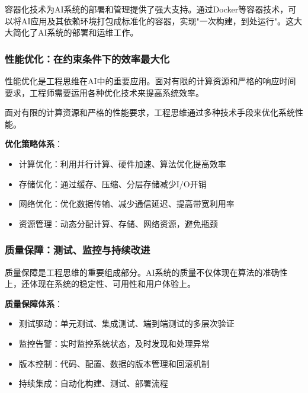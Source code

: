 容器化技术为AI系统的部署和管理提供了强大支持。通过Docker等容器技术，可以将AI应用及其依赖环境打包成标准化的容器，实现"一次构建，到处运行"。这大大简化了AI系统的部署和运维工作。

\subsubsection{性能优化：在约束条件下的效率最大化}

性能优化是工程思维在AI中的重要应用。面对有限的计算资源和严格的响应时间要求，工程师需要运用各种优化技术来提高系统效率。

面对有限的计算资源和严格的性能要求，工程思维通过多种技术手段来优化系统性能。

\textbf{优化策略体系}：
\begin{itemize}
\item 计算优化：利用并行计算、硬件加速、算法优化提高效率
\item 存储优化：通过缓存、压缩、分层存储减少I/O开销
\item 网络优化：优化数据传输、减少通信延迟、提高带宽利用率
\item 资源管理：动态分配计算、存储、网络资源，避免瓶颈
\end{itemize}

%
%

\subsubsection{质量保障：测试、监控与持续改进}

质量保障是工程思维的重要组成部分。AI系统的质量不仅体现在算法的准确性上，还体现在系统的稳定性、可用性和用户体验上。

\textbf{质量保障体系}：
 \begin{itemize}
 \item 测试驱动：单元测试、集成测试、端到端测试的多层次验证
 \item 监控告警：实时监控系统状态，及时发现和处理异常
 \item 版本控制：代码、配置、数据的版本管理和回滚机制
 \item 持续集成：自动化构建、测试、部署流程
 \end{itemize}

